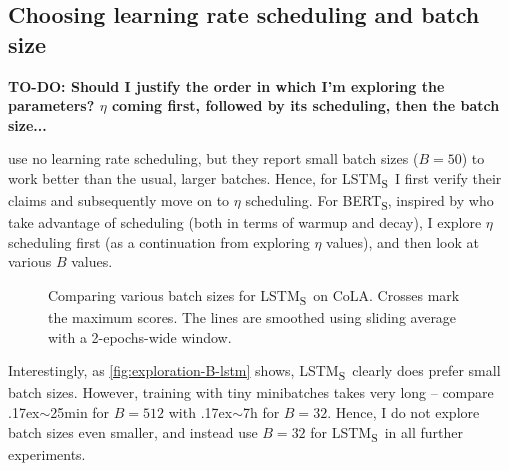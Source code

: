 \documentclass[bsc,frontabs,twoside,singlespacing,parskip,deptreport]{infthesis}
\def\mytilde{{\raise.17ex\hbox{$\scriptstyle\sim$}}}
\def\BERTS{BERT\textsubscript{S}}
\def\LSTMS{LSTM\textsubscript{S}}
\def\sliding{The lines are smoothed using sliding average with a 2-epochs-wide window.}
\begin{document}
{{    \subsection{Choosing learning rate scheduling and batch size}{
      \textbf{TO-DO: Should I justify the order in which I'm exploring the parameters? $\eta$ coming first, followed by its scheduling, then the batch size...}

      \citet{Tang_2019a} use no learning rate scheduling, but they report small batch sizes ($B=50$) to work better than the usual, larger batches. Hence, for \LSTMS~I first verify their claims and subsequently move on to $\eta$ scheduling. For \BERTS, inspired by \citet{Sanh_2019} who take advantage of scheduling (both in terms of warmup and decay), I explore $\eta$ scheduling first (as a continuation from exploring $\eta$ values), and then look at various $B$ values.

      \begin{figure}[h!t]
        \centering
        \caption{Comparing various batch sizes for \LSTMS~on CoLA. Crosses mark the maximum scores. \sliding}
        \label{fig:exploration-B-lstm}
      \end{figure}

      Interestingly, as \autoref{fig:exploration-B-lstm} shows, \LSTMS~clearly does prefer small batch sizes. However, training with tiny minibatches takes very long -- compare \mytilde25min for $B=512$ with \mytilde7h for $B=32$. Hence, I do not explore batch sizes even smaller, and instead use $B=32$ for \LSTMS~in all further experiments.

}}}
\end{document}
